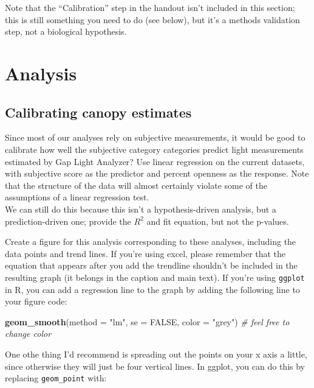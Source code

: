 \documentclass[]{book}
\newenvironment{Shaded}{\begin{snugshade}}{\end{snugshade}}
\newcommand{\KeywordTok}[1]{\textcolor[rgb]{0.13,0.29,0.53}{\textbf{#1}}}
\newcommand{\DataTypeTok}[1]{\textcolor[rgb]{0.13,0.29,0.53}{#1}}
\newcommand{\StringTok}[1]{\textcolor[rgb]{0.31,0.60,0.02}{#1}}
\newcommand{\CommentTok}[1]{\textcolor[rgb]{0.56,0.35,0.01}{\textit{#1}}}
\newcommand{\OtherTok}[1]{\textcolor[rgb]{0.56,0.35,0.01}{#1}}
\newcommand{\NormalTok}[1]{#1}
\begin{document}
Note that the ``Calibration'' step in the handout isn't included in this
section; this is still something you need to do (see below), but it's a
methods validation step, not a biological hypothesis.

\section{Analysis}\label{analysis}

\subsection{Calibrating canopy
estimates}\label{calibrating-canopy-estimates}

Since most of our analyses rely on subjective measurements, it would be
good to calibrate how well the subjective category categories predict
light measurements estimated by Gap Light Analyzer? Use linear
regression on the current datasets, with subjective score as the
predictor and percent openness as the response. Note that the structure
of the data will almost certainly violate some of the assumptions of a
linear regression test.\\
We can still do this because this isn't a hypothesis-driven analysis,
but a prediction-driven one; provide the \(R^2\) and fit equation, but
not the p-values.

Create a figure for this analysis corresponding to these analyses,
including the data points and trend lines. If you're using excel, please
remember that the equation that appears after you add the trendline
shouldn't be included in the resulting graph (it belongs in the caption
and main text). If you're using \texttt{ggplot} in R, you can add a
regression line to the graph by adding the following line to your figure
code:

\begin{Shaded}
\begin{Highlighting}[]
  \KeywordTok{geom_smooth}\NormalTok{(}\DataTypeTok{method =} \StringTok{"lm"}\NormalTok{, }\DataTypeTok{se =} \OtherTok{FALSE}\NormalTok{, }\DataTypeTok{color =} \StringTok{"grey"}\NormalTok{) }
  \CommentTok{# feel free to change color}
\end{Highlighting}
\end{Shaded}

One othe thing I'd recommend is spreading out the points on your x axis
a little, since otherwise they will just be four vertical lines. In
ggplot, you can do this by replacing \texttt{geom\_point} with:
\end{document}
